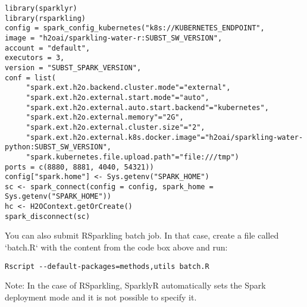 \begin{lstlisting}[style=R]
library(sparklyr)
library(rsparkling)
config = spark_config_kubernetes("k8s://KUBERNETES_ENDPOINT",
image = "h2oai/sparkling-water-r:SUBST_SW_VERSION",
account = "default",
executors = 3,
version = "SUBST_SPARK_VERSION",
conf = list(
     "spark.ext.h2o.backend.cluster.mode"="external",
     "spark.ext.h2o.external.start.mode"="auto",
     "spark.ext.h2o.external.auto.start.backend"="kubernetes",
     "spark.ext.h2o.external.memory"="2G",
     "spark.ext.h2o.external.cluster.size"="2",
     "spark.ext.h2o.external.k8s.docker.image"="h2oai/sparkling-water-python:SUBST_SW_VERSION",
     "spark.kubernetes.file.upload.path"="file:///tmp")
ports = c(8880, 8881, 4040, 54321))
config["spark.home"] <- Sys.getenv("SPARK_HOME")
sc <- spark_connect(config = config, spark_home = Sys.getenv("SPARK_HOME"))
hc <- H2OContext.getOrCreate()
spark_disconnect(sc)
\end{lstlisting}


You can also submit RSparkling batch job. In that case, create a file called `batch.R` with the content
from the code box above and run:

\begin{lstlisting}[style=Bash]
Rscript --default-packages=methods,utils batch.R
\end{lstlisting}

Note: In the case of RSparkling, SparklyR automatically sets the Spark deployment mode and it is not possible to specify it.
